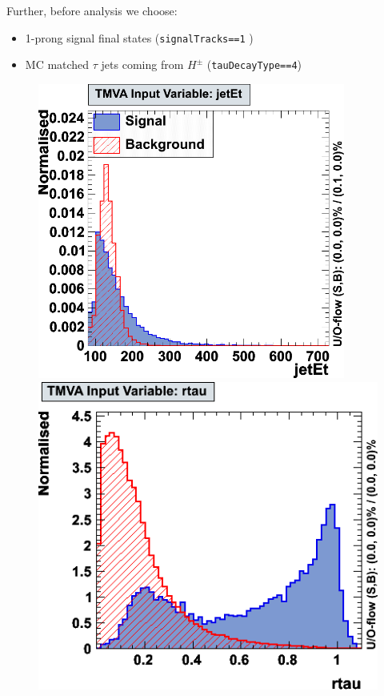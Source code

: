 \documentclass[a4paper]{jpconf}
\begin{document}
Further, before analysis we choose:
\begin{itemize}
\item 1-prong signal final states ({\tt signalTracks==1} )
\item MC matched $\tau$ jets coming from $H^{\pm}$ ({\tt tauDecayType==4})
\end{itemize}

\begin{figure}[h]
 \begin{minipage}{7.5cm}
\includegraphics[width=0.9\textwidth]{images/jetet.png}
\end{minipage}
 \hfill
\begin{minipage}{7.5cm}
\includegraphics[width=1.0\textwidth]{images/rtau.png}
\end{minipage}


\end{figure}
\end{document}
